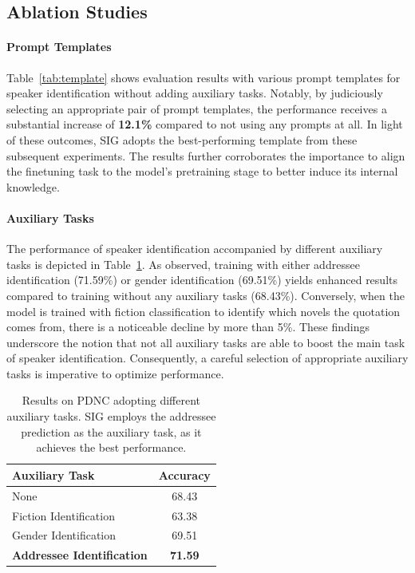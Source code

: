 \documentclass[letterpaper]{article} %
\begin{document}
\subsection{Ablation Studies}
\paragraph{Prompt Templates}
Table~\ref{tab:template} shows evaluation results with various prompt templates for speaker identification without adding auxiliary tasks.
Notably, by judiciously selecting an appropriate pair of prompt templates, the performance receives a substantial increase of \textbf{12.1\%} compared to not using any prompts at all. In light of these outcomes, SIG adopts the best-performing template from these subsequent experiments. The results further corroborates the importance to align the finetuning task to the model's pretraining stage to better induce its internal knowledge.

\paragraph{Auxiliary Tasks}
The performance of speaker identification accompanied by different auxiliary tasks is depicted in Table~\ref{tab:aux}. As observed, training with either addressee identification (71.59\%) or gender identification (69.51\%) yields enhanced results compared to training without any auxiliary tasks (68.43\%). Conversely, when the model is trained with fiction classification to identify which novels the quotation comes from, there is a noticeable decline by more than 5\%. These findings underscore the notion that not all auxiliary tasks are able to boost the main task of speaker identification. Consequently, a careful selection of appropriate auxiliary tasks is imperative to optimize performance.

\begin{table}[htbp!]
    \centering
    \begin{tabular}{l |c}

       \toprule
       \textbf{Auxiliary Task} &\textbf{Accuracy}\\
       \midrule  
       
       None & 68.43\\
       Fiction Identification & 63.38\\
       Gender Identification  & 69.51\\
       \textbf{Addressee Identification} & \textbf{71.59}\\
       \bottomrule
  
    \end{tabular}
    \caption{Results on PDNC adopting different auxiliary tasks. SIG employs the addressee prediction as the auxiliary task, as it achieves the best performance.}
    \label{tab:aux}
\end{table}
\end{document}
